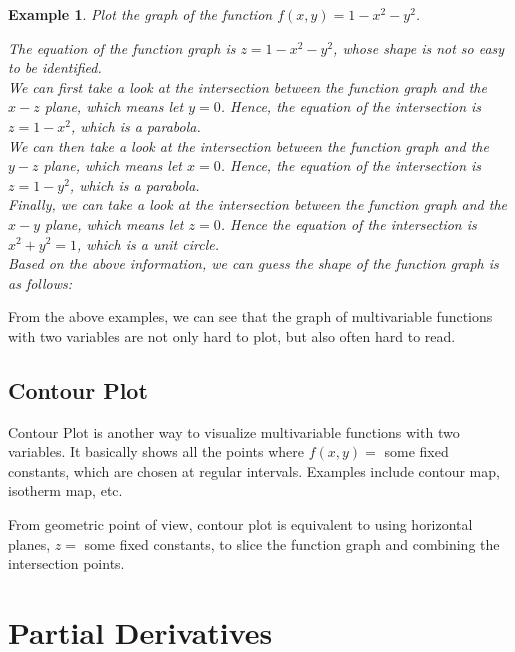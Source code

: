 \documentclass{article}
\newtheorem{example}{Example}
\begin{document}
\begin{example}
  Plot the graph of the function $f(x, y) = 1 - x^2 - y^2$.

  The equation of the function graph is $z = 1 - x^2 - y^2$, whose shape is not 
  so easy to be identified. \\
  We can first take a look at the intersection between the function graph and 
  the $x-z$ plane, which means let $y = 0$. Hence, the equation of the 
  intersection is $z = 1 - x^2$, which is a parabola. \\
  We can then take a look at the intersection between the function graph and the 
  $y-z$ plane, which means let $x = 0$. Hence, the equation of the intersection
  is $z = 1 - y^2$, which is a parabola. \\
  Finally, we can take a look at the intersection between the function graph and 
  the $x-y$ plane, which means let $z = 0$. Hence the equation of the 
  intersection is $x^2 + y^2 = 1$, which is a unit circle. \\
  Based on the above information, we can guess the shape of the function graph 
  is as follows:
\end{example}

From the above examples, we can see that the graph of multivariable functions 
with two variables are not only hard to plot, but also often hard to read.

\subsection{Contour Plot}

Contour Plot is another way to visualize multivariable functions with two 
variables. It basically shows all the points where $f(x, y) =$ some fixed 
constants, which are chosen at regular intervals. Examples include contour map,
isotherm map, etc.

From geometric point of view, contour plot is equivalent to using horizontal 
planes, $z =$ some fixed constants, to slice the function graph and combining 
the intersection points.

\section{Partial Derivatives}
\end{document}
